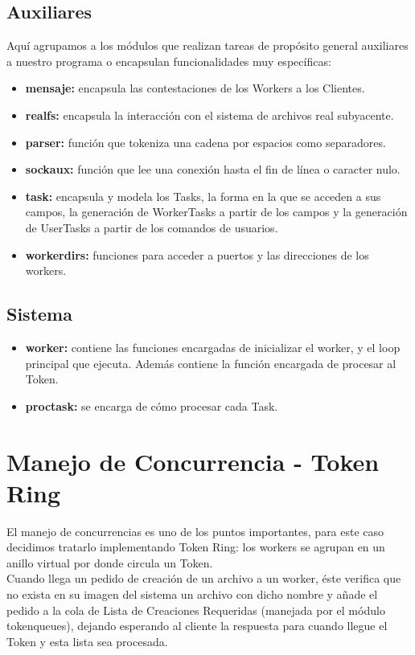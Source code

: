 \documentclass[12pt]{article}
\begin{document}
\subsection{Auxiliares}
Aquí agrupamos a los módulos que realizan tareas de propósito general auxiliares a nuestro programa o encapsulan funcionalidades muy específicas:
\begin{itemize}
\item \textbf{mensaje:} encapsula las contestaciones de los Workers a los Clientes.
\item \textbf{realfs:} encapsula la interacción con el sistema de archivos real subyacente.
\item \textbf{parser:} función que tokeniza una cadena por espacios como separadores.
\item \textbf{sockaux:} función que lee una conexión hasta el fin de línea o caracter nulo.
\item \textbf{task:} encapsula y modela los Tasks, la forma en la que se acceden a sus campos, la generación de WorkerTasks a partir de los campos y la generación de UserTasks a partir de los comandos de usuarios.
\item \textbf{workerdirs:} funciones para acceder a puertos y las direcciones de los workers.
\end{itemize}

\subsection{Sistema}
\begin{itemize}
\item \textbf{worker:} contiene las funciones encargadas de inicializar el worker, y el loop principal que ejecuta. Además contiene la función encargada de procesar al Token.
\item \textbf{proctask:} se encarga de cómo procesar cada Task.
\end{itemize}

\section{Manejo de Concurrencia - Token Ring}

El manejo de concurrencias es uno de los puntos importantes, para este caso decidimos tratarlo implementando Token Ring: los workers se agrupan en un anillo virtual por donde circula un Token.\\

Cuando llega un pedido de creación de un archivo a un worker, éste verifica que no exista en su imagen del sistema un archivo con dicho nombre y añade el pedido a la cola de Lista de Creaciones Requeridas (manejada por el módulo tokenqueues), dejando esperando al cliente la respuesta para cuando llegue el Token y esta lista sea procesada.\\
\end{document}
